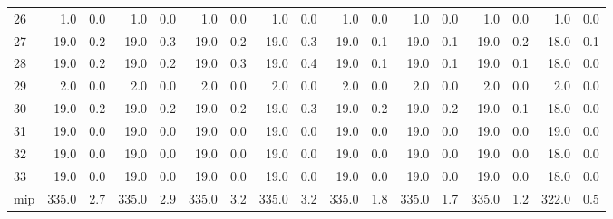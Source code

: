 \begin{tabular}{lrrrrrrrrrrrrrrrr}
     26 &   1.0 &   0.0 &   1.0 &     0.0 &   1.0 &     0.0 &   1.0 &     0.0 &   1.0 &     0.0 &   1.0 &     0.0 &   1.0 &     0.0 &   1.0 &     0.0 \\
     27 &  19.0 &   0.2 &  19.0 &     0.3 &  19.0 &     0.2 &  19.0 &     0.3 &  19.0 &     0.1 &  19.0 &     0.1 &  19.0 &     0.2 &  18.0 &     0.1 \\
     28 &  19.0 &   0.2 &  19.0 &     0.2 &  19.0 &     0.3 &  19.0 &     0.4 &  19.0 &     0.1 &  19.0 &     0.1 &  19.0 &     0.1 &  18.0 &     0.0 \\
     29 &   2.0 &   0.0 &   2.0 &     0.0 &   2.0 &     0.0 &   2.0 &     0.0 &   2.0 &     0.0 &   2.0 &     0.0 &   2.0 &     0.0 &   2.0 &     0.0 \\
     30 &  19.0 &   0.2 &  19.0 &     0.2 &  19.0 &     0.2 &  19.0 &     0.3 &  19.0 &     0.2 &  19.0 &     0.2 &  19.0 &     0.1 &  18.0 &     0.0 \\
     31 &  19.0 &   0.0 &  19.0 &     0.0 &  19.0 &     0.0 &  19.0 &     0.0 &  19.0 &     0.0 &  19.0 &     0.0 &  19.0 &     0.0 &  19.0 &     0.0 \\
     32 &  19.0 &   0.0 &  19.0 &     0.0 &  19.0 &     0.0 &  19.0 &     0.0 &  19.0 &     0.0 &  19.0 &     0.0 &  19.0 &     0.0 &  18.0 &     0.0 \\
     33 &  19.0 &   0.0 &  19.0 &     0.0 &  19.0 &     0.0 &  19.0 &     0.0 &  19.0 &     0.0 &  19.0 &     0.0 &  19.0 &     0.0 &  18.0 &     0.0 \\
    mip & 335.0 &   2.7 & 335.0 &     2.9 & 335.0 &     3.2 & 335.0 &     3.2 & 335.0 &     1.8 & 335.0 &     1.7 & 335.0 &     1.2 & 322.0 &     0.5 \\
\bottomrule
\end{tabular}
